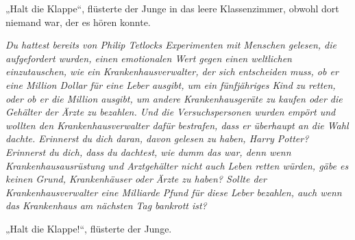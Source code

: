 „Halt die Klappe“, flüsterte der Junge in das leere Klassenzimmer, obwohl dort niemand war, der es hören konnte.

\emph{Du hattest bereits von Philip Tetlocks Experimenten mit Menschen gelesen, die aufgefordert wurden, einen emotionalen Wert gegen einen weltlichen einzutauschen, wie ein Krankenhausverwalter, der sich entscheiden muss, ob er eine Million Dollar für eine Leber ausgibt, um ein fünfjähriges Kind zu retten, oder ob er die Million ausgibt, um andere Krankenhausgeräte zu kaufen oder die Gehälter der Ärzte zu bezahlen. Und die Versuchspersonen wurden empört und wollten den Krankenhausverwalter dafür bestrafen, dass er überhaupt an die Wahl dachte. Erinnerst du dich daran, davon gelesen zu haben, Harry Potter? Erinnerst du dich, dass du dachtest, wie dumm das war, denn wenn Krankenhausausrüstung und Arztgehälter nicht auch Leben retten würden, gäbe es keinen Grund, Krankenhäuser oder Ärzte zu haben? Sollte der Krankenhausverwalter eine Milliarde Pfund für diese Leber bezahlen, auch wenn das Krankenhaus am nächsten Tag bankrott ist?}

„Halt die Klappe!“, flüsterte der Junge.

